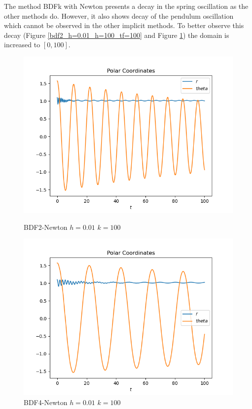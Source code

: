\documentclass{report}
\begin{document}
The method BDFk with Newton presents a decay in the spring oscillation as the other methods do.
However, it also shows decay of the pendulum oscillation which cannot be observed in the other implicit methods.
To better observe this decay (Figure \ref{bdf2_h=0.01_h=100_tf=100} and Figure \ref{bdf4_h=0.01_h=100_tf=100.png}) the domain is increased to $[0, 100]$.

\begin{figure}[h]
\centering
\begin{minipage}[b]{0.45\textwidth}
\centering
\includegraphics[width=\textwidth]{../Plots/BDFk/bdf2_h=0.01_h=100_tf=100}
\caption{BDF2-Newton $h=0.01$ $k=100$}
\label{bdf2_h=0.01_h=100_tf=100}
\end{minipage}
\hfill
\begin{minipage}[b]{0.45\textwidth}
\centering
\includegraphics[width=\textwidth]{../Plots/BDFk/bdf4_h=0.01_h=100_tf=100}
\caption{BDF4-Newton $h=0.01$ $k=100$}
\label{bdf4_h=0.01_h=100_tf=100.png}
\end{minipage}
\end{figure}
\end{document}
